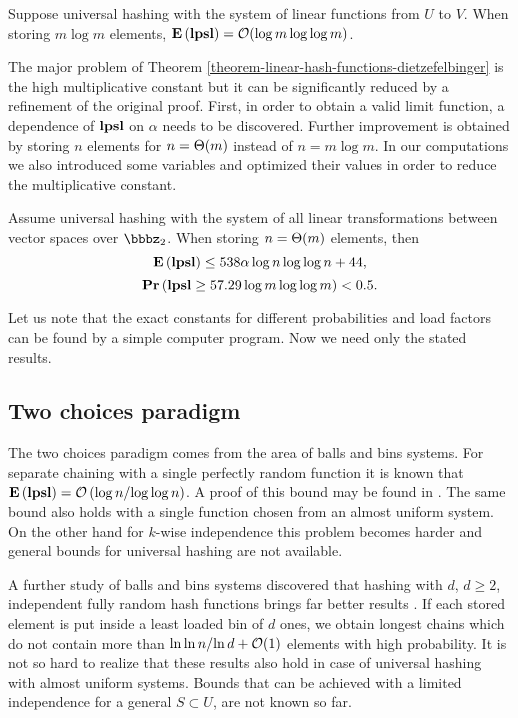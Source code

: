 \begin{theorem}
\label{theorem-linear-hash-functions-dietzefelbinger}
Suppose universal hashing with the system of linear functions from $U$ to $V$. When storing $m \log m$ elements, $\mathbf{E}\left(\mathbf{lpsl}\right) = \mathcal{O}(\log m \log \log m)$. 
\end{theorem}

The major problem of Theorem \ref{theorem-linear-hash-functions-dietzefelbinger} is the high multiplicative constant but it can be significantly reduced by a refinement of the original proof. First, in order to obtain a valid limit function, a dependence of $\mathbf{lpsl}$ on $\alpha$ needs to be discovered. Further improvement is obtained by storing $n$ elements for $n = \mathrm{\Theta}(m)$ instead of $n = m \log m$. In our computations we also introduced some variables and optimized their values in order to reduce the multiplicative constant.

\begin{theorem}
\label{theorem-linear-refined}
Assume universal hashing with the system of all linear transformations between vector spaces over $\bbbz_2$. When storing $n = \mathrm{\Theta}(m)$ elements, then $$\mathbf{E}\left(\mathbf{lpsl}\right) \leq 538 \alpha \log n \log \log n + 44,$$ $$\mathbf{Pr}\left(\mathbf{lpsl} \geq 57.29 \log m \log \log m\right) < 0.5.$$
\end{theorem}

Let us note that the exact constants for different probabilities and load factors can be found by a simple computer program. Now we need only the stated results.

\subsection{Two choices paradigm}
The two choices paradigm comes from the area of balls and bins systems. For separate chaining with a single perfectly random function it is known that $\mathbf{E}\left(\mathbf{lpsl}\right) = \mathcal{O}\left({\log n}/{\log \log n}\right)$. A proof of this bound may be found in \cite{DBLP:books/sp/Mehlhorn84}. The same bound also holds with a single function chosen from an almost uniform system. On the other hand for $k$-wise independence this problem becomes harder and general bounds for universal hashing are not available.

A further study of balls and bins systems discovered that hashing with $d$, $d \geq 2$, independent fully random hash functions brings far better results \cite{DBLP:conf/stoc/AzarBKU94}. If each stored element is put inside a least loaded bin of $d$ ones, we obtain longest chains which do not contain more than ${\ln \ln n}/{\ln d} + \mathcal{O}(1)$ elements with high probability. It is not so hard to realize that these results also hold in case of universal hashing with almost uniform systems. Bounds that can be achieved with a limited independence for a general $S \subset U$, are not known so far.


